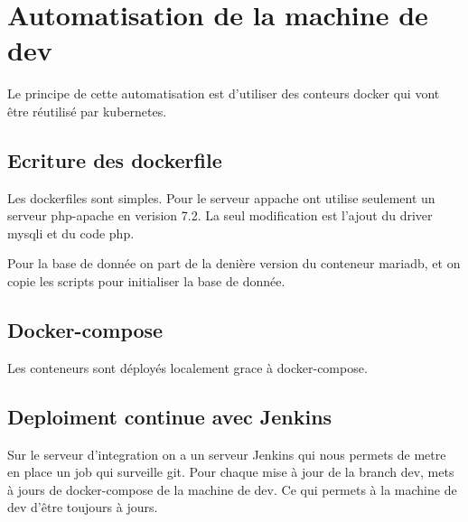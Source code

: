 \section{Automatisation de la machine de dev}
Le principe de cette automatisation est d'utiliser des conteurs docker qui vont être réutilisé par kubernetes.

\subsection{Ecriture des dockerfile}
Les dockerfiles sont simples.
Pour le serveur appache ont utilise seulement un serveur php-apache en verision 7.2. La seul modification est l'ajout du driver mysqli et du code php.



Pour la base de donnée on part de la denière version du conteneur mariadb, et on copie les scripts pour initialiser la base de donnée.



\subsection{Docker-compose}
Les conteneurs sont déployés localement grace à docker-compose.



\subsection{Deploiment continue avec Jenkins}
Sur le serveur d'integration on a un serveur Jenkins qui nous permets de metre en place un job qui surveille git.
Pour chaque mise à jour de la branch dev, mets à jours de docker-compose de la machine de dev.
Ce qui permets à la machine de dev d'être toujours à jours.


